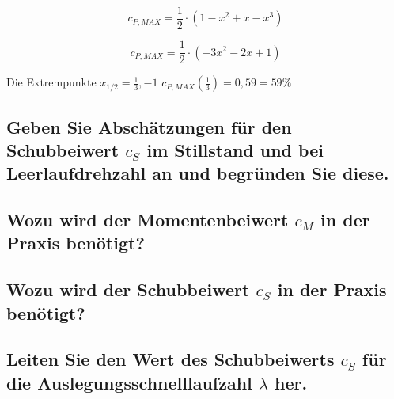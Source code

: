 \begin{equation}
c_{P,MAX}= \frac{1}{2} \cdot (1-x^2+x-x^3)
\label{eq:CPMAX}
\end{equation}

\begin{equation}
c_{P,MAX}=\frac{1}{2} \cdot (-3x^2-2x+1)
\label{eq:CPMAX2}
\end{equation}
 
Die Extrempunkte  $x_{1/2}= \frac{1}{3}, -1$
$c_{P,MAX}(\frac{1}{3})=0,59 = 59\%$

\subsection{Geben Sie Abschätzungen für den Schubbeiwert \texorpdfstring{$c_S$}{} im Stillstand und bei
Leerlaufdrehzahl an und begründen Sie diese.}



\subsection{Wozu wird der Momentenbeiwert \texorpdfstring{$c_M$}{} in der Praxis benötigt?}



\subsection{Wozu wird der Schubbeiwert \texorpdfstring{$c_S$}{} in der Praxis benötigt?}



\subsection{Leiten Sie den Wert des Schubbeiwerts \texorpdfstring{$c_S$}{} für die Auslegungsschnelllaufzahl \texorpdfstring{$\lambda$}{}
her.}






\label{sec:Vorbereitungsfragen}
